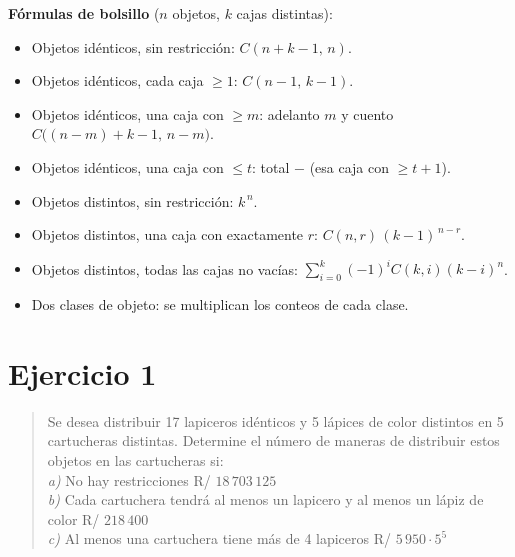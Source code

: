 \documentclass[11pt]{article}
\begin{document}
\begin{tip}
\textbf{Fórmulas de bolsillo} ($n$ objetos, $k$ cajas distintas):
\begin{itemize}[leftmargin=1.2cm]
  \item Objetos idénticos, sin restricción: $C(n+k-1,\,n)$.
  \item Objetos idénticos, cada caja $\ge 1$: $C(n-1,\,k-1)$.
  \item Objetos idénticos, una caja con $\ge m$: adelanto $m$ y cuento $C\bigl((n-m)+k-1,\,n-m\bigr)$.
  \item Objetos idénticos, una caja con $\le t$: total $-$ (esa caja con $\ge t+1$).
  \item Objetos distintos, sin restricción: $k^{\,n}$.
  \item Objetos distintos, una caja con exactamente $r$: $C(n,r)\,(k-1)^{\,n-r}$.
  \item Objetos distintos, todas las cajas no vacías: $\sum_{i=0}^{k}(-1)^i C(k,i)(k-i)^n$.
  \item Dos clases de objeto: se multiplican los conteos de cada clase.
\end{itemize}
\end{tip}

\section*{Ejercicio 1}

\begin{quote}
Se desea distribuir 17 lapiceros idénticos y 5 lápices de color distintos en 5 cartucheras distintas. Determine el número de maneras de distribuir estos objetos en las cartucheras si:\\
\textit{a)} No hay restricciones \hfill R/ $18\,703\,125$\\
\textit{b)} Cada cartuchera tendrá al menos un lapicero y al menos un lápiz de color \hfill R/ $218\,400$\\
\textit{c)} Al menos una cartuchera tiene más de 4 lapiceros \hfill R/ $5\,950\cdot 5^5$
\end{quote}
\end{document}

